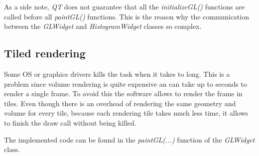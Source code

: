 \documentclass{article}
\begin{document}
As a side note, \textit{QT} does not guarantee that all the \textit{initializeGL()} functions are called before all \textit{paintGL()} functions. This is the reason why the communication between the \textit{GLWidget} and \textit{HistogramWidget} classes so complex. 
 
\subsection*{Tiled rendering}
Some OS or graphics drivers kills the task when it takes to long. This is a problem since volume rendering is quite expensive an can take up to seconds to render a single frame. To avoid this the software allows to render the frame in tiles. Even though there is an overhead of rendering the same geometry and volume for every tile, because each rendering tile takes much less time, it allows to finish the draw call without being killed.

The implemented code can be found in the \textit{paintGL(...)} function of the \textit{GLWidget} class. 
\end{document}
